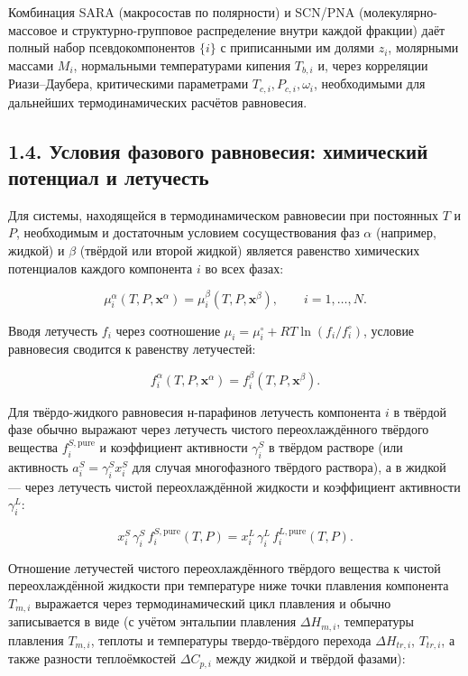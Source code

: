 \documentclass[11pt]{extarticle}
\begin{document}
Комбинация SARA (макросостав по полярности) и SCN/PNA (молекулярно-массовое и структурно-групповое распределение внутри каждой фракции) даёт полный набор псевдокомпонентов \(\{i\}\) с приписанными им долями \(z_i\), молярными массами \(M_i\), нормальными температурами кипения \(T_{b,i}\) и, через корреляции Риази--Даубера, критическими параметрами \(T_{c,i}, P_{c,i}, \omega_i\), необходимыми для дальнейших термодинамических расчётов равновесия.

\subsection{1.4. Условия фазового равновесия: химический потенциал и летучесть}\label{ux443ux441ux43bux43eux432ux438ux44f-ux444ux430ux437ux43eux432ux43eux433ux43e-ux440ux430ux432ux43dux43eux432ux435ux441ux438ux44f-ux445ux438ux43cux438ux447ux435ux441ux43aux438ux439-ux43fux43eux442ux435ux43dux446ux438ux430ux43b-ux438-ux43bux435ux442ux443ux447ux435ux441ux442ux44c}

Для системы, находящейся в термодинамическом равновесии при постоянных \(T\) и \(P\), необходимым и достаточным условием сосуществования фаз \(\alpha\) (например, жидкой) и \(\beta\) (твёрдой или второй жидкой) является равенство химических потенциалов каждого компонента \(i\) во всех фазах:

\[
\mu_i^{\alpha}(T,P,\mathbf{x}^\alpha) = \mu_i^{\beta}(T,P,\mathbf{x}^\beta), \qquad i = 1,\dots,N.
\]

Вводя летучесть \(f_i\) через соотношение \(\mu_i = \mu_i^{\circ} + RT\ln(f_i/f_i^{\circ})\), условие равновесия сводится к равенству летучестей:

\[
f_i^{\alpha}(T,P,\mathbf{x}^\alpha) = f_i^{\beta}(T,P,\mathbf{x}^\beta).
\]

Для твёрдо-жидкого равновесия н-парафинов летучесть компонента \(i\) в твёрдой фазе обычно выражают через летучесть чистого переохлаждённого твёрдого вещества \(f_i^{S,\text{pure}}\) и коэффициент активности \(\gamma_i^S\) в твёрдом растворе (или активность \(a_i^S = \gamma_i^S x_i^S\) для случая многофазного твёрдого раствора), а в жидкой --- через летучесть чистой переохлаждённой жидкости и коэффициент активности \(\gamma_i^L\):

\[
x_i^{S}\,\gamma_i^{S}\,f_i^{S,\text{pure}}(T,P) = x_i^{L}\,\gamma_i^{L}\,f_i^{L,\text{pure}}(T,P).
\]

Отношение летучестей чистого переохлаждённого твёрдого вещества к чистой переохлаждённой жидкости при температуре ниже точки плавления компонента \(T_{m,i}\) выражается через термодинамический цикл плавления и обычно записывается в виде (с учётом энтальпии плавления \(\Delta H_{m,i}\), температуры плавления \(T_{m,i}\), теплоты и температуры твердо-твёрдого перехода \(\Delta H_{tr,i}\), \(T_{tr,i}\), а также разности теплоёмкостей \(\Delta C_{p,i}\) между жидкой и твёрдой фазами):
\end{document}

